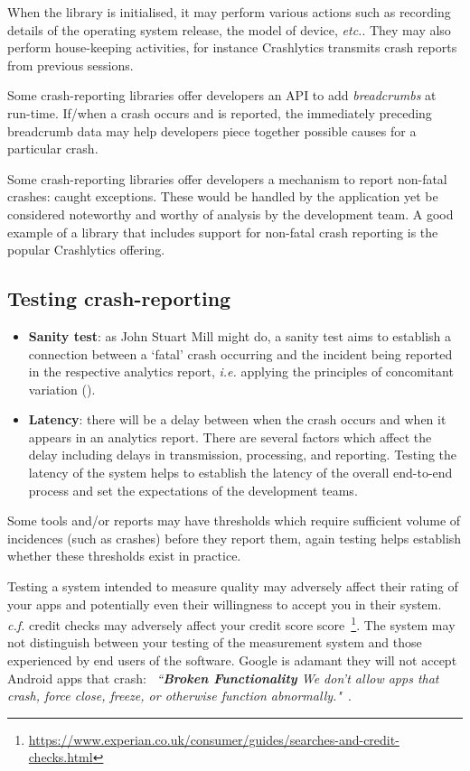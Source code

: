 When the library is initialised, it may perform various actions such as recording details of the operating system release, the model of device, \emph{etc.}. They may also perform house-keeping activities, for instance Crashlytics transmits crash reports from previous sessions.

Some crash-reporting libraries offer developers an API to add \emph{breadcrumbs} at run-time. If/when a crash occurs and is reported, the immediately preceding breadcrumb data may help developers piece together possible causes for a particular crash.

Some crash-reporting libraries offer developers a mechanism to report non-fatal crashes: caught exceptions. These would be handled by the application yet be considered noteworthy and worthy of analysis by the development team. A good example of a library that includes support for non-fatal crash reporting is the popular Crashlytics offering.  

\subsection{Testing crash-reporting}
\begin{itemize}
    \item \textbf{Sanity test}: as John Stuart Mill might do, a sanity test aims to establish a connection between a `fatal' crash occurring and the incident being reported in the respective analytics report, \emph{i.e.} applying the principles of concomitant variation (\cite{mill1884system}).
    \item \textbf{Latency}: there will be a delay between when the crash occurs and when it appears in an analytics report. There are several factors which affect the delay including delays in transmission, processing, and reporting. Testing the latency of the system helps to establish the latency of the overall end-to-end process and set the expectations of the development teams.
\end{itemize}

Some tools and/or reports may have thresholds which require sufficient volume of incidences (such as crashes) before they report them, again testing helps establish whether these thresholds exist in practice.

Testing a system intended to measure quality may adversely affect their rating of your apps and potentially even their willingness to accept you in their system. \emph{c.f.} credit checks may adversely affect your credit score score~\footnote{\url{https://www.experian.co.uk/consumer/guides/searches-and-credit-checks.html}}. The system may not distinguish between your testing of the measurement system and those experienced by end users of the software. Google is adamant they will not accept Android apps that crash: ~\emph{``\textbf{Broken Functionality} We don’t allow apps that crash, force close, freeze, or otherwise function abnormally."}~\cite{google_play_developer_policy_center}.


